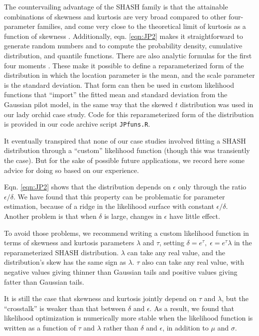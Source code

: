 \documentclass[12pt]{article}
\begin{document}
\begin{spacing}{1.35}
The countervailing advantage of the SHASH family is that the attainable combinations of skewness and kurtosis are very broad compared to other 
four-parameter families, and come very close to the theoretical limit of kurtosis as a function of skewness \citep[][Fig.  2]{jones-pewsey-2009}. 
Additionally, eqn. \eqref{eqn:JP2} makes it straightforward to generate random numbers and to compute 
the probability density, cumulative distribution, and quantile functions. There are also analytic formulas for the first four moments
\citep[][p. 764]{jones-pewsey-2009}. 
These make it possible to define a reparameterized form of the distribution in which the
location parameter is the mean, and the scale parameter is the standard deviation. That form can then be used in
custom likelihood functions that ``import'' the fitted mean and standard deviation from the Gaussian pilot model, 
in the same way that the skewed $t$ distribution was used in our lady orchid case study. 
Code for this reparameterized form of the distribution is provided in our code archive script \texttt{JPfuns.R}. 

It eventually transpired that none of our case studies involved fitting a SHASH distribution through a ``custom'' likelihood 
function (though this was transiently the case). But for the sake of possible future applications, we record here some 
advice for doing so based on our experience. 

Eqn. \eqref{eqn:JP2} shows that the distribution depends on $\epsilon$ only through the ratio $\epsilon/\delta$. We have found
that this property can be problematic for parameter estimation, because of a ridge in the likelihood surface with constant  
$\epsilon/\delta$. Another problem is that when $\delta$ is large, changes in $\epsilon$ have little effect. 

To avoid those problems, we recommend writing a custom likelihood function in terms of 
skewness and kurtosis parameters $\lambda$ and $\tau$, setting $\delta = e^{\tau}, \; \epsilon =  e^{\tau} \lambda$ in the 
reparameterized SHASH distribution. $\lambda$ can take any real value, and the distribution's skew has the same sign as $\lambda$. 
$\tau$ also can take any real value, with negative values giving thinner than Gaussian tails 
and positive values giving fatter than Gaussian tails. 

It is still the case that skewness and kurtosis jointly depend on $\tau$ and $\lambda$, but the
``crosstalk'' is weaker than that between $\delta$ and $\epsilon$. 
As a result, we found that likelihood optimization is numerically more stable when the likelihood function is 
written as a function of $\tau$ and $\lambda$ rather than $\delta$ and $\epsilon$, in addition to $\mu$ and $\sigma$.  


\end{spacing}
\end{document}

